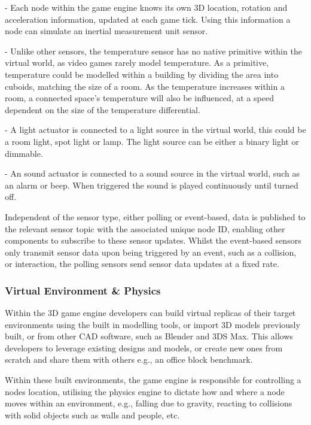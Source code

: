 \begin{description}[topsep=0pt]
  \item [IMU] - Each node within the game engine knows its own 3D location, rotation and acceleration information, updated at each game tick. Using this information a node can simulate an inertial measurement unit sensor.
  \item [Temperature] - Unlike other sensors, the temperature sensor has no native primitive within the virtual world, as video games rarely model temperature. As a primitive, temperature could be modelled within a building by dividing the area into cuboids, matching the size of a room. As the temperature increases within a room, a connected space's temperature will also be influenced, at a speed dependent on the size of the temperature differential.
  \item [Light] - A light actuator is connected to a light source in the virtual world, this could be a room light, spot light or lamp. The light source can be either a binary light or dimmable.
  \item [Sound] - An sound actuator is connected to a sound source in the virtual world, such as an alarm or beep. When triggered the sound is played continuously until turned off. 
 \end{description} 

Independent of the sensor type, either polling or event-based, data is published to the relevant sensor topic with the associated unique node ID, enabling other components to subscribe to these sensor updates. Whilst the event-based sensors only transmit sensor data upon being triggered by an event, such as a collision, or interaction, the polling sensors send sensor data updates at a fixed rate.

\subsubsection{Virtual Environment \& Physics} %
\label{ssub:virtual_environment}
Within the 3D game engine developers can build virtual replicas of their target environments using the built in modelling tools, or import 3D models previously built, or from other CAD software, such as Blender\cite{Blender} and 3DS Max. This allows developers to leverage existing designs and models, or create new ones from scratch and share them with others e.g., an office block benchmark.

Within these built environments, the game engine is responsible for controlling a nodes location, utilising the physics engine to dictate how and where a node moves within an environment, e.g., falling due to gravity, reacting to collisions with solid objects such as walls and people, etc.

